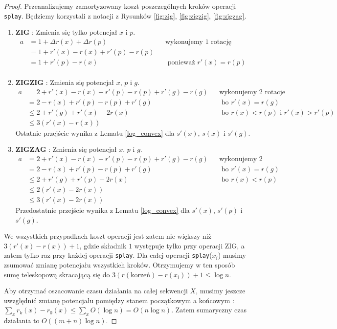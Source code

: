 \documentclass[declaration,shortabstract]{iithesis}
\theoremstyle{thm}
\theoremstyle{remark}
\theoremstyle{plain}
\theoremstyle{plain}
\theoremstyle{plain}
\begin{document}
\begin{proof}
Przeanalizujemy zamortyzowany koszt poszczególnych kroków operacji \texttt{splay}. Będziemy korzystali z notacji z Rysunków \ref{fig:zig}, \ref{fig:zigzig}, \ref{fig:zigzag}. 
\begin{enumerate} 
\item{\textbf{ZIG} : Zmienia się tylko potencjał $x$ i $p$.
\begin{align*} 
a & = 1 + \Delta r(x) + \Delta r(p) && \text{wykonujemy 1 rotację}\\
 & = 1 + r'(x) - r(x) + r'(p) - r(p) \\ 
 & = 1 + r'(p) - r(x) && \text{ ponieważ }r'(x) = r(p)\\ 
 \end{align*}} 
\item{\textbf{ZIGZIG} : Zmienia się potencjał $x$, $p$ i $g$. 
\begin{align*} 
a & = 2 + r'(x) - r(x) + r'(p) - r(p) + r'(g) - r(g) && \text{wykonujemy 2 rotacje}\\ 
& =2 - r(x) + r'(p) - r(p) + r'(g)   && \text{ bo } r'(x) = r(g)\\ 
& \leq 2 + r'(g) + r'(x) - 2r(x) && \text{ bo } r(x) < r(p) \text{ i } r'(x) > r'(p)\\ 
& \leq 3(r'(x) - r(x))
\end{align*}
Ostatnie przejście wynika z Lematu \ref{log_convex} dla $s'(x)$, $s(x)$ i $s'(g)$.}
\item{\textbf{ZIGZAG} : Zmienia się potencjał $x$, $p$ i $g$.
\begin{align*} 
a &=  2 + r'(x) - r(x) + r'(p) - r(p) + r'(g) - r(g) && \text{wykonujemy 2 rotacje}\\ 
& = 2 - r(x) + r'(p) - r(p) + r'(g)   && \text{ bo } r'(x) = r(g)\\ 
& \leq 2 + r'(g) + r'(p) - 2r(x) && \text{ bo }r(x) < r(p)\\ 
& \leq 2(r'(x) -2r(x)) \\
& \leq 3(r'(x) -2r(x))
\end{align*}
Przedostatnie przejście wynika z Lematu \ref{log_convex} dla $s'(x)$, $s'(p)$ i $s'(g)$.
} 
\end{enumerate} 
We wszystkich przypadkach koszt operacji jest zatem nie większy niż \( 3(r'(x) - r(x)) + 1\), gdzie składnik $1$ występuje tylko przy operacji ZIG, a zatem tylko raz przy każdej operacji \texttt{splay}. Dla całej operacji \texttt{splay}(\(x_i\)) musimy zsumować zmianę potencjału wszystkich kroków. Otrzymujemy w ten sposób sumę teleskopową skracającą się do \(3(r(\text{korzeń}) - r(x_i)) + 1 \leq \log n\). 

Aby otrzymać oszacowanie czasu działania na całej sekwencji $X$, musimy jeszcze uwzględnić zmianę potencjału pomiędzy stanem początkowym a końcowym : \( \sum_x r_k(x) - r_0(x) \leq \sum_x O(\log n) = O(n\log n)\). Zatem sumaryczny czas działania to \( O((m+n)\log n)\).  

\end{proof}  
\end{document}
